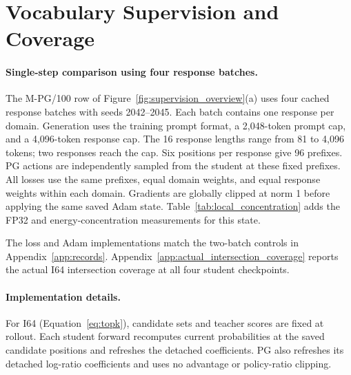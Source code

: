 \section{Vocabulary Supervision and Coverage}
\label{app:losses}

\paragraph{Single-step comparison using four response batches.}
The M-PG/100 row of Figure~\ref{fig:supervision_overview}(a) uses four cached response batches with seeds 2042--2045. Each batch contains one response per domain. Generation uses the training prompt format, a 2,048-token prompt cap, and a 4,096-token response cap. The 16 response lengths range from 81 to 4,096 tokens; two responses reach the cap. Six positions per response give 96 prefixes. PG actions are independently sampled from the student at these fixed prefixes. All losses use the same prefixes, equal domain weights, and equal response weights within each domain. Gradients are globally clipped at norm 1 before applying the same saved Adam state. Table~\ref{tab:local_concentration} adds the FP32 and energy-concentration measurements for this state.

\begin{table}[t]
\centering\small
\caption{\textbf{Vocabulary supervision produces similar single-step update concentration.} M-PG/100 means over four cached batches. NZ: nonzero coordinates (\%); top-1\%: squared step norm in the largest 1\% of coordinates (\%).}
\label{tab:local_concentration}

\end{table}

The loss and Adam implementations match the two-batch controls in Appendix~\ref{app:records}. Appendix~\ref{app:actual_intersection_coverage} reports the actual I64 intersection coverage at all four student checkpoints.


\paragraph{Implementation details.}
For I64 (Equation~\ref{eq:topk}), candidate sets and teacher scores are fixed at rollout. Each student forward recomputes current probabilities at the saved candidate positions and refreshes the detached coefficients. PG also refreshes its detached log-ratio coefficients and uses no advantage or policy-ratio clipping.

